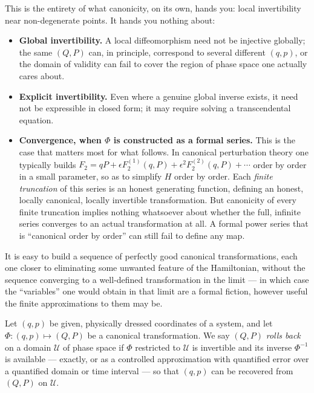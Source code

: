 This is the entirety of what canonicity, on its own, hands you: local
invertibility near non-degenerate points. It hands you nothing about:
\begin{itemize}
\item \textbf{Global invertibility.} A local diffeomorphism need not be
    injective globally; the same $(Q,P)$ can, in principle, correspond to
        several different $(q,p)$, or the domain of validity can fail to cover
        the region of phase space one actually cares about.
\item \textbf{Explicit invertibility.} Even where a genuine global inverse
    exists, it need not be expressible in closed form; it may require solving a
        transcendental equation.
\item \textbf{Convergence, when $\Phi$ is constructed as a formal series.} This
    is the case that matters most for what follows. In canonical perturbation
        theory one typically builds $F_2=qP+\epsilon
        F_2^{(1)}(q,P)+\epsilon^2F_2^{(2)}(q,P)+\cdots$ order by order in a
        small parameter, so as to simplify $H$ order by order. Each
        \emph{finite truncation} of this series is an honest generating
        function, defining an honest, locally canonical, locally invertible
        transformation. But canonicity of every finite truncation implies
        nothing whatsoever about whether the full, infinite series converges to
        an actual transformation at all. A formal power series that is
        ``canonical order by order'' can still fail to define any map.
\end{itemize}

It is easy to build a sequence of
perfectly good canonical transformations, each one closer to eliminating some
unwanted feature of the Hamiltonian, without the sequence converging to a
well-defined transformation in the limit --- in which case the ``variables''
one would obtain in that limit are a formal fiction, however useful the finite
approximations to them may be.


\begin{definition}
Let $(q,p)$ be given, physically dressed coordinates of a system, and let
    $\Phi:(q,p)\mapsto(Q,P)$ be a canonical transformation. We say $(Q,P)$
    \emph{rolls back} on a domain $\mathcal U$ of phase space if $\Phi$
    restricted to $\mathcal U$ is invertible and its inverse $\Phi^{-1}$ is
    available --- exactly, or as a controlled approximation with quantified
    error over a quantified domain or time interval --- so that $(q,p)$ can be
    recovered from $(Q,P)$ on $\mathcal U$.
\end{definition}


